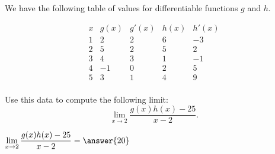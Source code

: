 \documentclass{ximera}
\author{Steven Gubkin and Bobby Ramsey}
\begin{document}
\begin{exercise}

We have the following table of values for differentiable functions $g$ and $h$.

\[
\begin{array}{c|c|c|c|c}
 x & g(x) & g'(x) & h(x) & h'(x)\\ \hline
 1 & 2 & 2 & 6 & -3\\ 
 2 & 5 & 2 & 5 & 2\\
 3 & 4 & 3 & 1 & -1\\ 
 4 & -1 & 0 & 2 & 5\\ 
 5 & 3 & 1 & 4 & 9\\ 
\end{array}
\]

Use this data to compute the following limit:
\[ \lim_{x \to 2} \frac{g(x)h(x)-25}{x-2}. \]

\begin{prompt}
	$\displaystyle \lim_{x \to 2} \frac{g(x)h(x)-25}{x-2} = \answer{20}$
\end{prompt}

\end{exercise}
\end{document}
